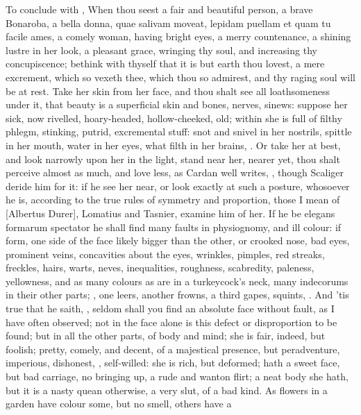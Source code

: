 To conclude with \Chrysostom{}, When thou seest a fair and beautiful
person, a brave Bonaroba, a bella donna, quae salivam moveat, lepidam
puellam et quam tu facile ames, a comely woman, having bright eyes, a
merry countenance, a shining lustre in her look, a pleasant grace,
wringing thy soul, and increasing thy concupiscence; bethink with
thyself that it is but earth thou lovest, a mere excrement, which so
vexeth thee, which thou so admirest, and thy raging soul will be at
rest. Take her skin from her face, and thou shalt see all loathsomeness
under it, that beauty is a superficial skin and bones, nerves, sinews:
suppose her sick, now rivelled, hoary-headed, hollow-cheeked, old;
within she is full of filthy phlegm, stinking, putrid, excremental
stuff: snot and snivel in her nostrils, spittle in her mouth, water in
her eyes, what filth in her brains, \etc{}. Or take her at best, and look
narrowly upon her in the light, stand near her, nearer yet, thou shalt
perceive almost as much, and love less, as  Cardan well writes,
, though Scaliger deride him for it: if he
see her near, or look exactly at such a posture, whosoever he is,
according to the true rules of symmetry and proportion, those I mean of
[Albertus Durer], Lomatius and Tasnier, examine him of her. If he be
elegans formarum spectator he shall find many faults in physiognomy,
and ill colour: if form, one side of the face likely bigger than the
other, or crooked nose, bad eyes, prominent veins, concavities about
the eyes, wrinkles, pimples, red streaks, freckles, hairs, warts,
neves, inequalities, roughness, scabredity, paleness, yellowness, and
as many colours as are in a turkeycock's neck, many indecorums in their
other parts; , one leers, another
frowns, a third gapes, squints, \etc{}. And 'tis true that he saith,
, seldom shall you find an absolute face without fault, as I have
often observed; not in the face alone is this defect or disproportion
to be found; but in all the other parts, of body and mind; she is fair,
indeed, but foolish; pretty, comely, and decent, of a majestical
presence, but peradventure, imperious, dishonest, ,
self-willed: she is rich, but deformed; hath a sweet face, but bad
carriage, no bringing up, a rude and wanton flirt; a neat body she
hath, but it is a nasty quean otherwise, a very slut, of a bad kind. As
flowers in a garden have colour some, but no smell, others have a

